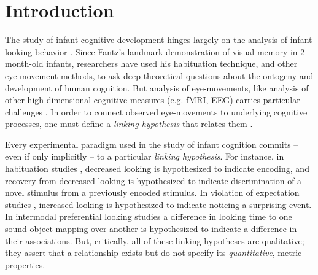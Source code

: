 \documentclass[12pt]{article}
\begin{document}
\section*{Introduction}

The study of infant cognitive development hinges largely on the analysis of infant looking behavior \cite{Aslin2007}. Since Fantz's \cite{Fantz1964} landmark demonstration of visual memory in 2-month-old infants, researchers have used his habituation technique, and other eye-movement methods, to ask deep theoretical questions about the ontogeny and development of human cognition. But analysis of eye-movements, like analysis of other high-dimensional cognitive measures (e.g. fMRI, EEG) carries particular challenges \cite{Yu2012}. In order to connect observed eye-movements to underlying cognitive processes, one must define a \emph{linking hypothesis} that relates them \cite{Aslin2007, Teller1984}. 
	
	Every experimental paradigm used in the study of infant cognition commits -- even if only implicitly -- to a particular \emph{linking hypothesis}. For instance, in habituation studies \cite{Fantz1964, Stager1997}, decreased looking is hypothesized to indicate encoding, and recovery from decreased looking is hypothesized to indicate discrimination of a novel stimulus from a previously encoded stimulus. In violation of expectation studies \cite{Baillargeon1986, Kobayashi2005}, increased looking is hypothesized to indicate noticing a surprising event. In intermodal preferential looking studies \cite{Golinkoff1987, Smith2008} a difference in looking time to one sound-object mapping over another is hypothesized to indicate a difference in their associations. But, critically, all of these linking hypotheses are qualitative; they assert that a relationship exists but do not specify its \emph{quantitative}, metric properties.
	
\end{document}
